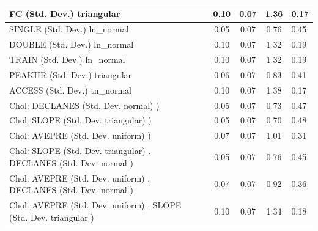 \begin{table}
\begin{center}
\begin{tabular}{|l|l|c|c|c|l|}
			\hline
			FC (Std. Dev.) triangular &  & 0.10 & 0.07 & 1.36 & 0.17 \\
			\hline
			SINGLE (Std. Dev.) ln_normal &  & 0.05 & 0.07 & 0.76 & 0.45 \\
			\hline
			DOUBLE (Std. Dev.) ln_normal &  & 0.10 & 0.07 & 1.32 & 0.19 \\
			\hline
			TRAIN (Std. Dev.) ln_normal &  & 0.10 & 0.07 & 1.32 & 0.19 \\
			\hline
			PEAKHR (Std. Dev.) triangular &  & 0.06 & 0.07 & 0.83 & 0.41 \\
			\hline
			ACCESS (Std. Dev.) tn_normal &  & 0.10 & 0.07 & 1.38 & 0.17 \\
			\hline
			 Chol: DECLANES (Std. Dev. normal) ) &  & 0.05 & 0.07 & 0.73 & 0.47 \\
			\hline
			 Chol: SLOPE (Std. Dev. triangular) ) &  & 0.05 & 0.07 & 0.70 & 0.48 \\
			\hline
			 Chol: AVEPRE (Std. Dev. uniform) ) &  & 0.07 & 0.07 & 1.01 & 0.31 \\
			\hline
			 Chol: SLOPE (Std. Dev. triangular) . DECLANES (Std. Dev.   normal ) &  & 0.05 & 0.07 & 0.76 & 0.45 \\
			\hline
			 Chol: AVEPRE (Std. Dev. uniform) . DECLANES (Std. Dev.   normal ) &  & 0.07 & 0.07 & 0.92 & 0.36 \\
			\hline
			 Chol: AVEPRE (Std. Dev. uniform) . SLOPE (Std. Dev.   triangular ) &  & 0.10 & 0.07 & 1.34 & 0.18 \\
			\hline
		\end{tabular}
	\end{center}
\end{table}